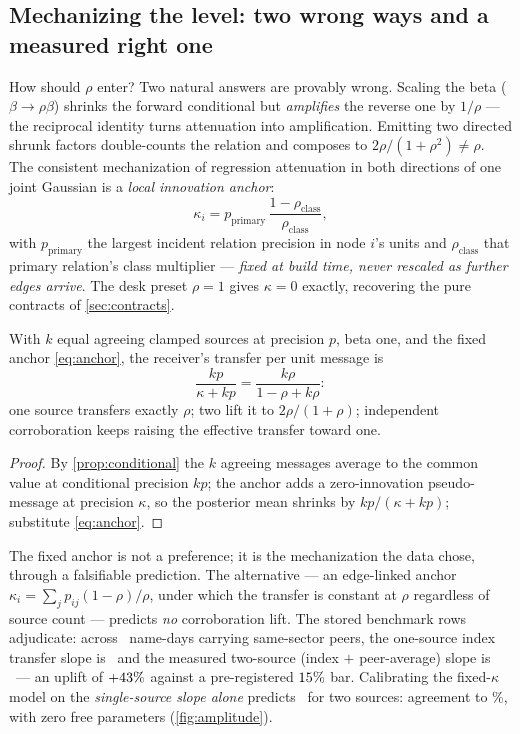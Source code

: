 \documentclass[11pt]{article}
\begin{document}
\subsection{Mechanizing the level: two wrong ways and a measured right
one}

How should $\rho$ enter?  Two natural answers are provably wrong.
Scaling the beta ($\beta\to\rho\beta$) shrinks the forward conditional
but \emph{amplifies} the reverse one by $1/\rho$ --- the reciprocal
identity turns attenuation into amplification.  Emitting two directed
shrunk factors double-counts the relation and composes to
$2\rho/(1+\rho^2)\neq\rho$.  The consistent mechanization of
regression attenuation in both directions of one joint Gaussian is a
\emph{local innovation anchor}:
\begin{equation}
\kappa_i=p_{\mathrm{primary}}\,\frac{1-\rho_{\mathrm{class}}}
{\rho_{\mathrm{class}}},
\label{eq:anchor}
\end{equation}
with $p_{\mathrm{primary}}$ the largest incident relation precision in
node $i$'s units and $\rho_{\mathrm{class}}$ that primary relation's
class multiplier --- \emph{fixed at build time, never rescaled as
further edges arrive}.  The desk preset $\rho=1$ gives $\kappa=0$
exactly, recovering the pure contracts of \cref{sec:contracts}.

\begin{proposition}
\label{prop:corroboration}
With $k$ equal agreeing clamped sources at precision $p$, beta one, and
the fixed anchor \eqref{eq:anchor}, the receiver's transfer per unit
message is
\[
\frac{kp}{\kappa+kp}=\frac{k\rho}{1-\rho+k\rho}:
\]
one source transfers exactly $\rho$; two lift it to $2\rho/(1+\rho)$;
independent corroboration keeps raising the effective transfer toward
one.
\end{proposition}

\begin{proof}
By \cref{prop:conditional} the $k$ agreeing messages average to the
common value at conditional precision $kp$; the anchor adds a
zero-innovation pseudo-message at precision $\kappa$, so the posterior
mean shrinks by $kp/(\kappa+kp)$; substitute \eqref{eq:anchor}.
\end{proof}

The fixed anchor is not a preference; it is the mechanization the data
chose, through a falsifiable prediction.  The alternative --- an
edge-linked anchor $\kappa_i=\sum_jp_{ij}(1-\rho)/\rho$, under which
the transfer is constant at $\rho$ regardless of source count ---
predicts \emph{no} corroboration lift.  The stored benchmark rows
adjudicate: across \gmphasen\ name-days carrying same-sector peers,
the one-source index transfer slope is \gmrhoindex\ and the measured
two-source (index $+$ peer-average) slope is \gmtwosource\ --- an
uplift of $+43\%$ against a pre-registered $15\%$
bar.  Calibrating the fixed-$\kappa$ model on the \emph{single-source
slope alone} predicts \gmpredtwo\ for two sources: agreement to
\gmpredgap\%, with zero free parameters (\cref{fig:amplitude}).
\end{document}
